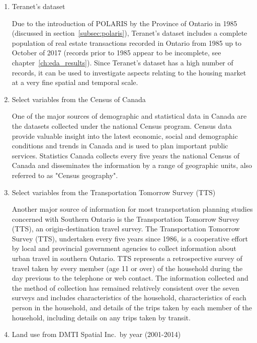 \begin{enumerate}
    \item Teranet's dataset

    Due to the introduction of POLARIS by the Province of Ontario in 1985 (discussed in section~\ref{subsec:polaris}), Teranet's dataset includes a complete population of real estate transactions recorded in Ontario from 1985 up to October of 2017 (records prior to 1985 appear to be incomplete, see chapter~\ref{ch:eda_results}).
    Since Teranet's dataset has a high number of records, it can be used to investigate aspects relating to the housing market at a very fine spatial and temporal scale.

    \item Select variables from the Census of Canada

    One of the major sources of demographic and statistical data in Canada are the datasets collected under the national Census program.
    Census data provide valuable insight into the latest economic, social and demographic conditions and trends in Canada and is used to plan important public services.
    Statistics Canada collects every five years the national Census of Canada and disseminates the information by a range of geographic units, also referred to as "Census geography"\cite{MapandDataLibrary2019}.

    \item Select variables from the Transportation Tomorrow Survey (TTS)

    Another major source of information for most transportation planning studies concerned with Southern Ontario is the Transportation Tomorrow Survey (TTS), an origin-destination travel survey\cite{DataManagementGroup2014}.
    The Transportation Tomorrow Survey (TTS), undertaken every five years since 1986, is a cooperative effort by local and provincial government agencies to collect information about urban travel in southern Ontario.
    TTS represents a retrospective survey of travel taken by every member (age 11 or over) of the household during the day previous to the telephone or web contact.
    The information collected and the method of collection has remained relatively consistent over the seven surveys and includes characteristics of the household, characteristics of each person in the household, and details of the trips taken by each member of the household, including details on any trips taken by transit\cite{Ashby2018}.

    \item Land use from DMTI Spatial Inc.\ by year (2001-2014)


\end{enumerate}
